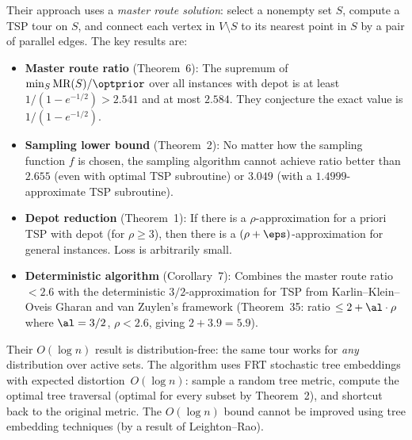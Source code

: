 \begin{remark}
    Their approach uses a \emph{master route solution}: select a nonempty set $S$, compute a TSP tour on $S$, and connect each vertex in $V \setminus S$ to its nearest point in $S$ by a pair of parallel edges. The key results are:

    \begin{itemize}
        \item \textbf{Master route ratio} (Theorem~6): The supremum of $\min_S \text{MR}(S) / \optprior$ over all instances with depot is at least $1/(1 - e^{-1/2}) > 2.541$ and at most $2.584$. They conjecture the exact value is $1/(1 - e^{-1/2})$.

        \item \textbf{Sampling lower bound} (Theorem~2): No matter how the sampling function $f$ is chosen, the sampling algorithm cannot achieve ratio better than $2.655$ (even with optimal TSP subroutine) or $3.049$ (with a $1.4999$-approximate TSP subroutine).

        \item \textbf{Depot reduction} (Theorem~1): If there is a $\rho$-approximation for a priori TSP with depot (for $\rho \ge 3$), then there is a $(\rho + \eps)$-approximation for general instances. Loss is arbitrarily small.

        \item \textbf{Deterministic algorithm} (Corollary~7): Combines the master route ratio $< 2.6$ with the deterministic $3/2$-approximation for TSP from Karlin--Klein--Oveis Gharan and van Zuylen's framework (Theorem~35: ratio $\le 2 + \al \cdot \rho$ where $\al = 3/2$, $\rho < 2.6$, giving $2 + 3.9 = 5.9$).
    \end{itemize}
\end{remark}

\begin{remark}
    Their $O(\log n)$ result is distribution-free: the same tour works
    for \emph{any} distribution over active sets.
    The algorithm uses FRT stochastic tree embeddings
    with expected distortion~$O(\log n)$:
    sample a random tree metric, compute the optimal tree
    traversal (optimal for every subset by Theorem~2),
    and shortcut back to the original metric.
    The $O(\log n)$ bound cannot be improved using tree embedding
    techniques (by a result of Leighton--Rao).
\end{remark}


